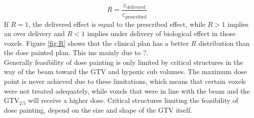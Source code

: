 \begin{equation}
R = \frac{\varepsilon_\mathrm{delivered}}{\varepsilon_\mathrm{prescribed}}
\end{equation}
If $R=1$, the delivered effect is equal to the prescribed effect, while $R>1$ implies an over delivery and $R<1$ implies under delivery of biological effect in those voxels. Figure \ref{fig:R} shows that the clinical plan has a better $R$ distribution than the dose painted plan. This ins mainly due to ?.\\Generally feasibility of dose painting is only limited by critical structures in the way of the beam toward the GTV and hypoxic sub volumes. The maximum dose point is never achieved due to these limitations, which means that certain voxels were not treated adequately, while voxels that were in line with the beam and the GTV$_{2.5}$ will receive a higher dose. Critical structures limiting the feasibility of dose painting, depend on the size and shape of the GTV itself.

